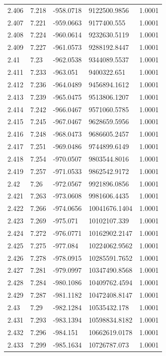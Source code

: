 \begin{tabular}{lllll}
2.406 & 7.218 & -958.0718 & 9122500.9856 & 1.0001 \\
2.407 & 7.221 & -959.0663 & 9177400.555 & 1.0001 \\
2.408 & 7.224 & -960.0614 & 9232630.5119 & 1.0001 \\
2.409 & 7.227 & -961.0573 & 9288192.8447 & 1.0001 \\
2.41 & 7.23 & -962.0538 & 9344089.5537 & 1.0001 \\
2.411 & 7.233 & -963.051 & 9400322.651 & 1.0001 \\
2.412 & 7.236 & -964.0489 & 9456894.1612 & 1.0001 \\
2.413 & 7.239 & -965.0475 & 9513806.1207 & 1.0001 \\
2.414 & 7.242 & -966.0467 & 9571060.5785 & 1.0001 \\
2.415 & 7.245 & -967.0467 & 9628659.5956 & 1.0001 \\
2.416 & 7.248 & -968.0473 & 9686605.2457 & 1.0001 \\
2.417 & 7.251 & -969.0486 & 9744899.6149 & 1.0001 \\
2.418 & 7.254 & -970.0507 & 9803544.8016 & 1.0001 \\
2.419 & 7.257 & -971.0533 & 9862542.9172 & 1.0001 \\
2.42 & 7.26 & -972.0567 & 9921896.0856 & 1.0001 \\
2.421 & 7.263 & -973.0608 & 9981606.4435 & 1.0001 \\
2.422 & 7.266 & -974.0656 & 10041676.1404 & 1.0001 \\
2.423 & 7.269 & -975.071 & 10102107.339 & 1.0001 \\
2.424 & 7.272 & -976.0771 & 10162902.2147 & 1.0001 \\
2.425 & 7.275 & -977.084 & 10224062.9562 & 1.0001 \\
2.426 & 7.278 & -978.0915 & 10285591.7652 & 1.0001 \\
2.427 & 7.281 & -979.0997 & 10347490.8568 & 1.0001 \\
2.428 & 7.284 & -980.1086 & 10409762.4594 & 1.0001 \\
2.429 & 7.287 & -981.1182 & 10472408.8147 & 1.0001 \\
2.43 & 7.29 & -982.1284 & 10535432.178 & 1.0001 \\
2.431 & 7.293 & -983.1394 & 10598834.8182 & 1.0001 \\
2.432 & 7.296 & -984.151 & 10662619.0178 & 1.0001 \\
2.433 & 7.299 & -985.1634 & 10726787.073 & 1.0001 \\

\end{tabular}

